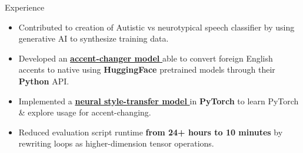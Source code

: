 \documentclass{resume} %
\begin{document}
\begin{workSection}{Experience}
	\experienceItem[
	company=UTEP,
	location=El Paso{,} TX,
	position=Undergraduate Research Assistant,
	duration=January 2024 - May 2024,
	]
	\begin{itemize}
		\vspace{-0.5em}
		\itemsep -6pt {}
		\item Contributed to creation of Autistic vs neurotypical speech classifier by using generative AI to synthesize training data.
		 \item Developed an \href{https://github.com/AshkanArabim/accent-change-paper-implementation}{\textbf{accent-changer model} \faExternalLink} able to convert foreign English accents to native using \textbf{HuggingFace} pretrained models through their \textbf{Python} API.
		\item Implemented a \href{https://github.com/AshkanArabim/neural-style-transfer}{\textbf{neural style-transfer model} \faExternalLink} in \textbf{PyTorch} to learn PyTorch \& explore usage for accent-changing.
       \item Reduced evaluation script runtime \textbf{from 24+ hours to 10 minutes} by rewriting loops as higher-dimension tensor operations.
	\end{itemize}
	


\end{workSection}
\end{document}
